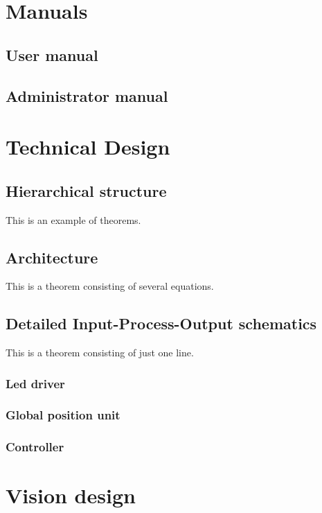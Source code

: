 \documentclass[11pt,fleqn,,a4paper,twoside,openright]{book}
\begin{document}
\chapter{Manuals}

\section{User manual}

\section{Administrator manual}

\chapter{Technical Design}

\section{Hierarchical structure} 

This is an example of theorems.

\section{Architecture} 
This is a theorem consisting of several equations.

\section{Detailed Input-Process-Output schematics} 
This is a theorem consisting of just one line.

\subsection{Led driver}

\subsection{Global position unit}

\subsection{Controller}

\chapter{Vision design}
\end{document}
